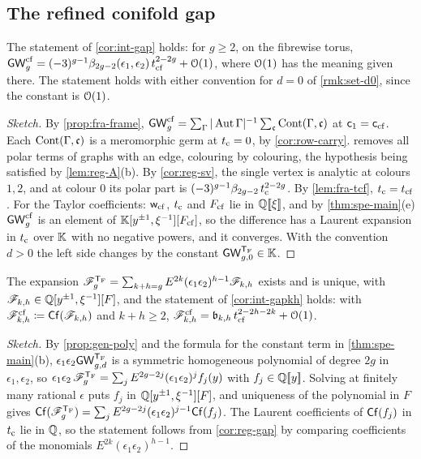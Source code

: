 \subsection{The refined conifold gap}
\label{sec:reg-gap}

\begin{cor}
\label{cor:reg-gap}
The statement of \cref{cor:int-gap} holds: for $g\geq 2$, on the fibrewise torus, $\mathsf{GW}^{\mathrm{cf}}_g=(-3)^{g-1}\beta_{2g-2}(\epsilon_1,\epsilon_2)\,t_{\mathrm{cf}}^{2-2g}+\mathcal{O}(1)$, where $\mathcal{O}(1)$ has the meaning given there. The statement holds with either convention for $d=0$ of \cref{rmk:set-d0}, since the constant is $\mathcal{O}(1)$.
\end{cor}

\begin{proof}[Sketch]
By \cref{prop:fra-frame}, $\mathsf{GW}^{\mathrm{cf}}_g=\sum_\Gamma|\operatorname{Aut}\Gamma|^{-1}\sum_{\mathfrak{c}}\mathrm{Cont}(\Gamma,\mathfrak{c})$ at $\mathsf{c}_{1}=\mathsf{c}_{\mathrm{cf}}$. Each $\mathrm{Cont}(\Gamma,\mathfrak{c})$ is a meromorphic germ at $t_{\mathrm{c}}=0$, by \cref{cor:row-carry}.  removes all polar terms of graphs with an edge, colouring by colouring, the hypothesis being satisfied by \cref{lem:reg-A}\textup{(b)}. By \cref{cor:reg-sv}, the single vertex is analytic at colours $1,2$, and at colour $0$ its polar part is $(-3)^{g-1}\beta_{2g-2}\,t_{\mathrm{c}}^{2-2g}$. By \cref{lem:fra-tcf}, $t_{\mathrm{c}}=t_{\mathrm{cf}}$. For the Taylor coefficients: $\mathsf{w}_{\mathrm{cf}}$, $t_{\mathrm{c}}$ and $F_{\mathrm{cf}}$ lie in $\mathbb{Q}[\![ \xi ]\!]$, and by \cref{thm:spe-main}\textup{(e)} $\mathsf{GW}^{\mathrm{cf}}_g$ is an element of $\mathbb{K}[y^{\pm1},\xi^{-1}][F_{\mathrm{cf}}]$, so the difference has a Laurent expansion in $t_{\mathrm{c}}$ over $\mathbb{K}$ with no negative powers, and it converges. With the convention $d>0$ the left side changes by the constant $\mathsf{GW}_{g,0}^{\mathsf{T}_{\mathrm{F}}}\in\mathbb{K}$.
\end{proof}

\begin{cor}
\label{cor:reg-gapkh}
The expansion $\mathscr{F}_g^{\mathsf{T}_{\mathrm{F}}}=\sum_{k+h=g}E^{2k}(\epsilon_1\epsilon_2)^{h-1}\mathscr{F}_{k,h}$ exists and is unique, with $\mathscr{F}_{k,h}\in\mathbb{Q}[y^{\pm1},\xi^{-1}][F]$, and the statement of \cref{cor:int-gapkh} holds: with $\mathscr{F}^{\mathrm{cf}}_{k,h}\coloneqq\mathsf{Cf}(\mathscr{F}_{k,h})$ and $k+h\geq 2$, $\mathscr{F}^{\mathrm{cf}}_{k,h}=\mathfrak{b}_{k,h}\,t_{\mathrm{cf}}^{2-2h-2k}+\mathcal{O}(1)$.
\end{cor}

\begin{proof}[Sketch]
By \cref{prop:gen-poly} and the formula for the constant term in \cref{thm:spe-main}\textup{(b)}, $\epsilon_1\epsilon_2\mathsf{GW}_{g,d}^{\mathsf{T}_{\mathrm{F}}}$ is a symmetric homogeneous polynomial of degree $2g$ in $\epsilon_1,\epsilon_2$, so $\epsilon_1\epsilon_2\,\mathscr{F}_g^{\mathsf{T}_{\mathrm{F}}}=\sum_jE^{2g-2j}(\epsilon_1\epsilon_2)^j f_j(y)$ with $f_j\in\mathbb{Q}[\![ y ]\!]$. Solving at finitely many rational $\epsilon$ puts $f_j$ in $\mathbb{Q}[y^{\pm1},\xi^{-1}][F]$, and uniqueness of the polynomial in $F$ gives $\mathsf{Cf}(\mathscr{F}_g^{\mathsf{T}_{\mathrm{F}}})=\sum_jE^{2g-2j}(\epsilon_1\epsilon_2)^{j-1}\mathsf{Cf}(f_j)$. The Laurent coefficients of $\mathsf{Cf}(f_j)$ in $t_{\mathrm{c}}$ lie in $\mathbb{Q}$, so the statement follows from \cref{cor:reg-gap} by comparing coefficients of the monomials $E^{2k}(\epsilon_1\epsilon_2)^{h-1}$.
\end{proof}

